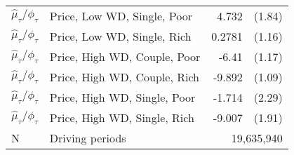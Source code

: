 \begin{tabular}{llrr}
          $\hat{\mu}_{\tau} / \phi_\tau$  &               Price, Low WD, Single, Poor    &         4.732    &  (1.84) \\ 
          $\hat{\mu}_{\tau} / \phi_\tau$  &               Price, Low WD, Single, Rich    &        0.2781    &  (1.16) \\ 
          $\hat{\mu}_{\tau} / \phi_\tau$  &              Price, High WD, Couple, Poor    &         -6.41    &  (1.17) \\ 
          $\hat{\mu}_{\tau} / \phi_\tau$  &              Price, High WD, Couple, Rich    &        -9.892    &  (1.09) \\ 
          $\hat{\mu}_{\tau} / \phi_\tau$  &              Price, High WD, Single, Poor    &        -1.714    &  (2.29) \\ 
          $\hat{\mu}_{\tau} / \phi_\tau$  &              Price, High WD, Single, Rich    &        -9.007    &  (1.91) \\ 
\midrule 
N & Driving periods & \multicolumn{2}{r}{19,635,940}  \\ 
\bottomrule
\end{tabular} 

